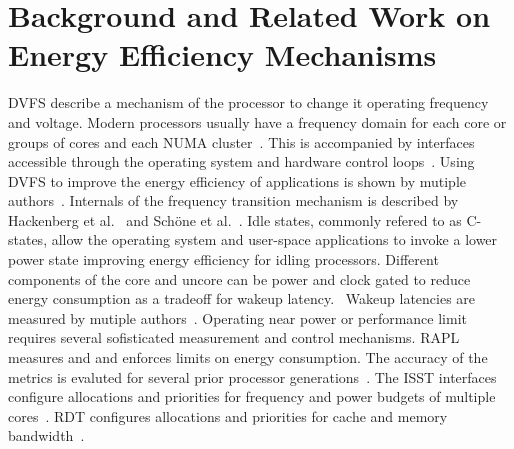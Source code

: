 \chapter{Background and Related Work on Energy Efficiency Mechanisms}
\label{sec:background}

\ac{DVFS} describe a mechanism of the processor to change it operating frequency and voltage.
Modern processors usually have a frequency domain for each core or groups of cores and each \ac{NUMA} cluster~\cite{Intel_2017_Skylake_SP,Schoene_2024_Alder_Lake,Schoene_2021_Zen2}.
This is accompanied by interfaces accessible through the operating system and hardware control loops~\cite{intel_pstate_kernel_doc,Kernel_IntelSpeedSelect}.
Using \ac{DVFS} to improve the energy efficiency of applications is shown by mutiple authors~\cite{Gocht_2019_QLearning,Vysocky_2018_HPCTuning}.
Internals of the frequency transition mechanism is described by Hackenberg et al.~\cite{Hackenberg_2015_Haswell} and Schöne et al.~\cite{Intel_2017_Skylake_SP,Schoene_2021_Zen2,Schoene_2024_Alder_Lake}.
Idle states, commonly refered to as C-states, allow the operating system and user-space applications to invoke a lower power state improving energy efficiency for idling processors.
Different components of the core and uncore can be power and clock gated to reduce energy consumption as a tradeoff for wakeup latency.~\cite{Intel_PowerManagementTechnologyReviewIceLake,Kuns_2025_UserSpaceIdle}
Wakeup latencies are measured by mutiple authors~\cite{Hackenberg_2015_Haswell,Intel_2017_Skylake_SP,Schoene_2021_Zen2,Schoene_2024_Alder_Lake,Smejkal_2024_SleepWell}.
Operating near power or performance limit requires several sofisticated measurement and control mechanisms.
\ac{RAPL} measures and and enforces limits on energy consumption.
The accuracy of the metrics is evaluted for several prior processor generations~\cite{Haehnel_2012_RAPL,Hackenberg_2015_Haswell,Intel_2017_Skylake_SP,AMD_Zen2_Overview,Schoene_2024_Alder_Lake}.
The \ac{ISST} interfaces configure allocations and priorities for frequency and power budgets of multiple cores~\cite{Kernel_IntelSpeedSelect,Intel_2021_HPM}.
\ac{RDT} configures allocations and priorities for cache and memory bandwidth~\cite{Sohal_2022_RDT,Intel_2021_HPM}.